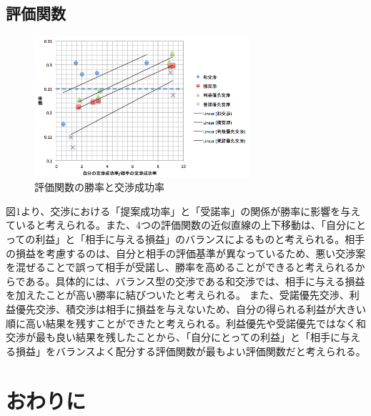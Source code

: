 \documentclass[a4, 10pt,dvipdfmx,twocolumn]{jsarticle}
\begin{document}
\subsection{評価関数}


\begin{figure}[h]
    \begin{center}
      \includegraphics[width=80mm]{img/relation_winrate.png}
    \end{center}
    \caption{評価関数の勝率と交渉成功率}
    \label{win_rate}
\end{figure}
図1より、交渉における「提案成功率」と「受諾率」の関係が勝率に影響を与えていると考えられる。また、4つの評価関数の近似直線の上下移動は、「自分にとっての利益」と「相手に与える損益」のバランスによるものと考えられる。相手の損益を考慮するのは、自分と相手の評価基準が異なっているため、悪い交渉案を混ぜることで誤って相手が受諾し、勝率を高めることができると考えられるからである。具体的には、バランス型の交渉である和交渉では、相手に与える損益を加えたことが高い勝率に結びついたと考えられる。
また、受諾優先交渉、利益優先交渉、積交渉は相手に損益を与えないため、自分の得られる利益が大きい順に高い結果を残すことができたと考えられる。利益優先や受諾優先ではなく和交渉が最も良い結果を残したことから、「自分にとっての利益」と「相手に与える損益」をバランスよく配分する評価関数が最もよい評価関数だと考えられる。



\section{おわりに}

\end{document}
